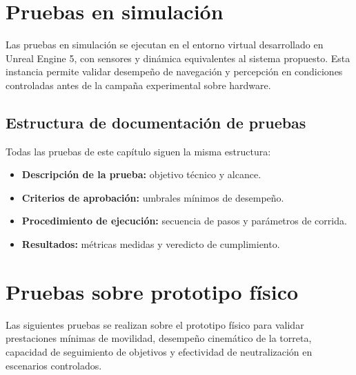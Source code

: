 \section{Pruebas en simulación}

Las pruebas en simulación se ejecutan en el entorno virtual desarrollado en Unreal Engine 5, con sensores y dinámica equivalentes al sistema propuesto. Esta instancia permite validar desempeño de navegación y percepción en condiciones controladas antes de la campaña experimental sobre hardware.

\subsection{Estructura de documentación de pruebas}

Todas las pruebas de este capítulo siguen la misma estructura:
\begin{itemize}
    \item \textbf{Descripción de la prueba:} objetivo técnico y alcance.
    \item \textbf{Criterios de aprobación:} umbrales mínimos de desempeño.
    \item \textbf{Procedimiento de ejecución:} secuencia de pasos y parámetros de corrida.
    \item \textbf{Resultados:} métricas medidas y veredicto de cumplimiento.
\end{itemize}






\section{Pruebas sobre prototipo físico}

Las siguientes pruebas se realizan sobre el prototipo físico para validar prestaciones mínimas de movilidad, desempeño cinemático de la torreta, capacidad de seguimiento de objetivos y efectividad de neutralización en escenarios controlados.





